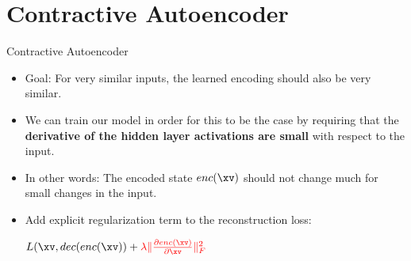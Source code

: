 % 
%   
%     
%   
% 
%     
%   

\section{Contractive Autoencoder}

\begin{frame}[t]{Contractive Autoencoder}
   \begin{itemize}
      \item Goal: For very similar inputs, the learned encoding should also be very similar. 
      \item We can train our model in order for this to be the case by requiring that the \textbf{derivative of the hidden layer activations are small} with respect to the input. 
      \item In other words: The encoded state $enc(\xv)$ should not change much for small changes in the input. 
      \item Add explicit regularization term to the reconstruction loss:\\
           \begin{center}
       $L(\xv, dec(enc(\xv)) + \color{red}{\lambda \Vert \frac{\partial enc(\xv)}{\partial \xv} \Vert^2_F}$ 
   \end{center}
   \end{itemize} 

\end{frame}



